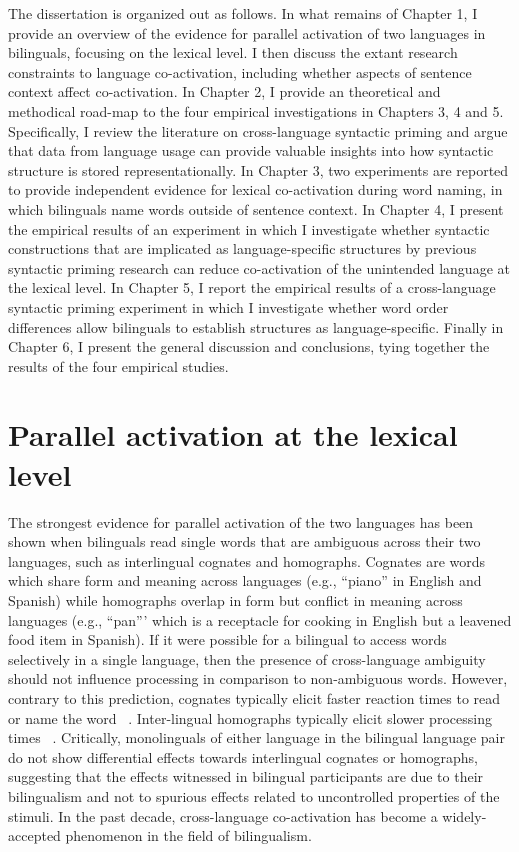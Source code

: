 The dissertation is organized out as follows. In what remains of Chapter 1, I provide an overview of the evidence for parallel activation of two languages in bilinguals, focusing on the lexical level. I then discuss the extant research constraints to language co-activation, including whether aspects of sentence context affect co-activation. In Chapter 2, I provide an theoretical and methodical road-map to the four empirical investigations in Chapters 3, 4 and 5. Specifically, I review the literature on cross-language syntactic priming and argue that data from language usage can provide valuable insights into how syntactic structure is stored representationally. In Chapter 3, two experiments are reported to provide independent evidence for lexical co-activation during word naming, in which bilinguals name words outside of sentence context. In Chapter 4, I present the empirical results of an experiment in which I investigate whether syntactic constructions that are implicated as language-specific structures by previous syntactic priming research can reduce co-activation of the unintended language at the lexical level. In Chapter 5, I report the empirical results of a cross-language syntactic priming experiment in which I investigate whether word order differences allow bilinguals to establish structures as language-specific. Finally in Chapter 6, I present the general discussion and conclusions, tying together the results of the four empirical studies. 

\section{Parallel activation at the lexical level}
\label{parallelactivationatthelexicallevel}

The strongest evidence for parallel activation of the two languages has been shown when bilinguals read single words that are ambiguous across their two languages, such as interlingual cognates and homographs. Cognates are words which share form and meaning across languages (e.g., ``piano'' in English and Spanish) while homographs overlap in form but conflict in meaning across languages (e.g., ``pan''' which is a receptacle for cooking in English but a leavened food item in Spanish). If it were possible for a bilingual to access words selectively in a single language, then the presence of cross-language ambiguity should not influence processing in comparison to non-ambiguous words. However, contrary to this prediction, cognates typically elicit faster reaction times to read or name the word ~\citep[i.e., cognate facilitation; e.g.,][]{Dijkstra1998,Schwartz2007,VanHell2002}. Inter-lingual homographs typically elicit slower processing times ~\citep[i.e., homograph inhibition; e.g., ][]{Beauvillain1987a,Dijkstra1998}. Critically, monolinguals of either language in the bilingual language pair do not show differential effects towards interlingual cognates or homographs, suggesting that the effects witnessed in bilingual participants are due to their bilingualism and not to spurious effects related to uncontrolled properties of the stimuli. In the past decade, cross-language co-activation has become a widely-accepted phenomenon in the field of bilingualism. 

